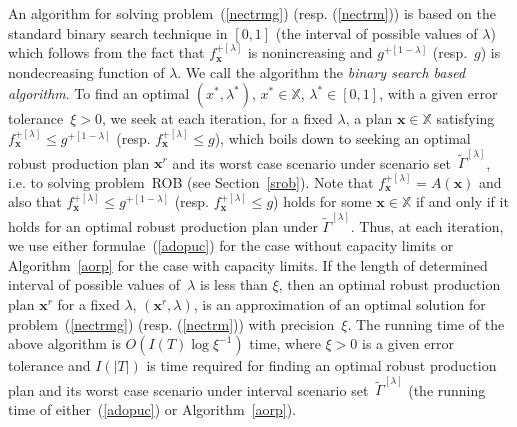 \documentclass[11pt]{article}
\newcommand{\Xset}{\mathbb{X}}
\begin{document}
An algorithm for solving problem~(\ref{nectrmg}) (resp. (\ref{nectrm}))
is based on the standard  binary search 
technique in $[0,1]$ (the interval of possible values of $\lambda$)
 which follows from the fact that 
$f^{+[\lambda]}_{\pmb{x}}$ is nonincreasing and
 $g^{+[1-\lambda]}$ (resp.~$g$) is nondecreasing function of $\lambda$. We call
 the algorithm the \emph{binary search based algorithm}.
To find an optimal  $(x^{*},\lambda^{*})$, $x^{*}\in\Xset$, $\lambda^{*}\in [0,1]$, with a given 
error tolerance~$\xi>0$, we seek
at each iteration, for a fixed $\lambda$,
a plan $\pmb{x}\in \Xset$ satisfying 
$f^{+[\lambda]}_{\pmb{x}}\leq g^{+[1-\lambda]}$ (resp.
$f^{+[\lambda]}_{\pmb{x}}\leq g$), which boils down to 
seeking an optimal robust production plan $\pmb{x}^{r}$ and its worst case scenario
under scenario set~$\widetilde{\Gamma}^{[\lambda]}$,
i.e. to solving problem~\textsc{ROB} (see Section~\ref{srob}). 
Note that $f^{+[\lambda]}_{\pmb{x}}=A(\pmb{x})$
and also that 
$f^{+[\lambda]}_{\pmb{x}}\leq g^{+[1-\lambda]}$ (resp.
$f^{+[\lambda]}_{\pmb{x}}\leq g$) holds for some $\pmb{x}\in \Xset$
 if and only if it holds for an optimal robust production plan under $\widetilde{\Gamma}^{[\lambda]}$.
Thus, at each iteration, we use  either formulae~(\ref{adopuc}) for the case without capacity limits or
Algorithm~\ref{aorp} for the case with capacity limits.
If the length of determined interval of possible values of~$\lambda$ is less than $\xi$, then
an optimal robust production plan $\pmb{x}^{r}$ for a fixed $\lambda$, $(\pmb{x}^{r},\lambda)$,  is
an approximation of
an optimal solution for
problem~(\ref{nectrmg}) (resp. (\ref{nectrm})) with precision~$\xi$.
The running time of the above algorithm is
$O(I(T)\log\xi^{-1})$ time, where $\xi>0$ is a given
error tolerance and $I(|T|)$ is  time required 
for finding 
an optimal robust production plan  and its worst case scenario
under interval scenario set~$\widetilde{\Gamma}^{[\lambda]}$ 
(the running time of either~(\ref{adopuc}) or Algorithm~\ref{aorp}).
\end{document}
